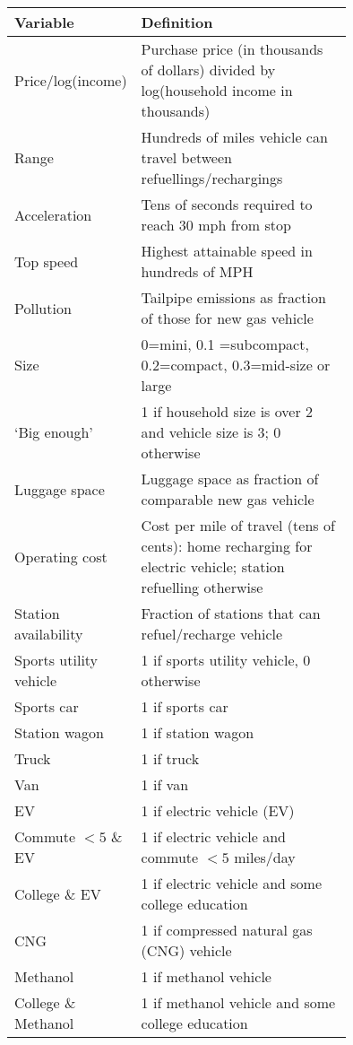 \begin{tabular}{l K{0.75\linewidth}}
\toprule
{Variable} & {Definition}\\
\midrule

Price/log(income) & Purchase price (in thousands of dollars) divided by log(household income in thousands) \\
Range & Hundreds of miles vehicle can travel between refuellings/rechargings \\
Acceleration & Tens of seconds required to reach 30 mph from stop \\
Top speed & Highest attainable speed in hundreds of MPH\\
Pollution & Tailpipe emissions as fraction of those for new gas vehicle \\
Size & 0=mini, 0.1 =subcompact, 0.2=compact, 0.3=mid-size or large \\
`Big enough' & 1 if household size is over 2 and vehicle size is 3; 0 otherwise \\
Luggage space & Luggage space as fraction of comparable new gas vehicle \\
Operating cost & Cost per mile of travel (tens of cents): home recharging for electric vehicle; station refuelling otherwise \\
Station availability & Fraction of stations that can refuel/recharge vehicle\\
Sports utility vehicle & 1 if sports utility vehicle, 0 otherwise\\
Sports car & 1 if sports car\\
Station wagon & 1 if station wagon\\
Truck & 1 if truck\\
Van & 1 if van\\
EV & 1 if electric vehicle (EV)\\
Commute $< 5$ \& EV & 1 if electric vehicle and commute $< 5$ miles/day\\
College \& EV & 1 if electric vehicle and some college education\\
CNG & 1 if compressed natural gas (CNG) vehicle\\
Methanol & 1 if methanol vehicle\\
College \& Methanol & 1 if methanol vehicle and some college education\\

\bottomrule
\end{tabular}